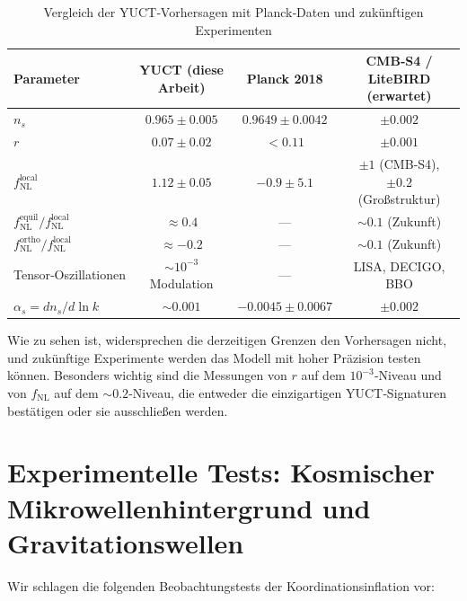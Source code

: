 \documentclass[11pt,a4paper]{article}
\newcommand{\rs}{r}
\begin{document}
	\begin{table}[htbp]
		\centering
		\caption{Vergleich der YUCT‑Vorhersagen mit Planck‑Daten und zukünftigen Experimenten}
		\label{tab:comparison}
		\begin{tabular}{lccc}
			\toprule
			\textbf{Parameter} & \textbf{YUCT (diese Arbeit)} & \textbf{Planck 2018} & \textbf{CMB‑S4 / LiteBIRD (erwartet)} \\
			\midrule
			\(n_s\) & \(0.965 \pm 0.005\) & \(0.9649 \pm 0.0042\) & \(\pm 0.002\) \\
			\(\rs\) & \(0.07 \pm 0.02\) & \(<0.11\) & \(\pm 0.001\) \\
			\(f_{\mathrm{NL}}^{\mathrm{local}}\) & \(1.12 \pm 0.05\) & \(-0.9 \pm 5.1\) & \(\pm 1\) (CMB‑S4), \(\pm 0.2\) (Großstruktur) \\
			\(f_{\mathrm{NL}}^{\mathrm{equil}} / f_{\mathrm{NL}}^{\mathrm{local}}\) & \(\approx 0.4\) & — & \(\sim 0.1\) (Zukunft) \\
			\(f_{\mathrm{NL}}^{\mathrm{ortho}} / f_{\mathrm{NL}}^{\mathrm{local}}\) & \(\approx -0.2\) & — & \(\sim 0.1\) (Zukunft) \\
			Tensor‑Oszillationen & \( \sim 10^{-3}\) Modulation & — & LISA, DECIGO, BBO \\
			\(\alpha_s = dn_s/d\ln k\) & \(\sim 0.001\) & \(-0.0045 \pm 0.0067\) & \(\pm 0.002\) \\
			\bottomrule
		\end{tabular}
	\end{table}
	
	Wie zu sehen ist, widersprechen die derzeitigen Grenzen den Vorhersagen nicht, und zukünftige Experimente werden das Modell mit hoher Präzision testen können. Besonders wichtig sind die Messungen von \(r\) auf dem \(10^{-3}\)‑Niveau und von \(f_{\text{NL}}\) auf dem \(\sim 0.2\)‑Niveau, die entweder die einzigartigen YUCT‑Signaturen bestätigen oder sie ausschließen werden.
	
	\section{Experimentelle Tests: Kosmischer Mikrowellenhintergrund und Gravitationswellen}
	\label{sec:tests}
	
	Wir schlagen die folgenden Beobachtungstests der Koordinationsinflation vor:
	
\end{document}
